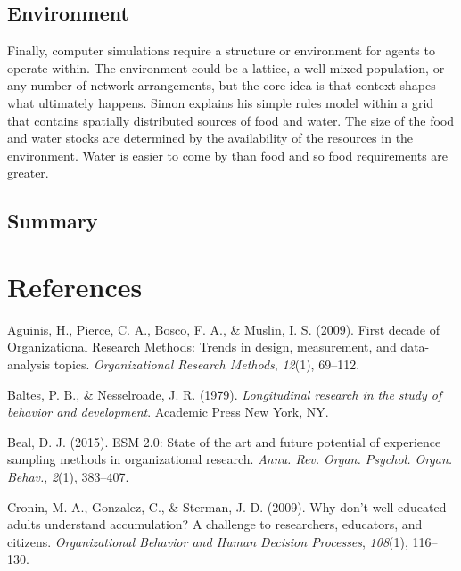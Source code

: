 \documentclass[english,,man]{apa6}
\theoremstyle{definition}
\theoremstyle{definition}
\theoremstyle{definition}
\theoremstyle{remark}
\begin{document}
\hypertarget{environment}{%
\subsection{Environment}\label{environment}}

Finally, computer simulations require a structure or environment for
agents to operate within. The environment could be a lattice, a
well-mixed population, or any number of network arrangements, but the
core idea is that context shapes what ultimately happens. Simon explains
his simple rules model within a grid that contains spatially distributed
sources of food and water. The size of the food and water stocks are
determined by the availability of the resources in the environment.
Water is easier to come by than food and so food requirements are
greater.

\hypertarget{summary-2}{%
\subsection{Summary}\label{summary-2}}

\newpage

\hypertarget{references}{%
\section{References}\label{references}}

\setlength{\parindent}{-0.5in}
\setlength{\leftskip}{0.5in}

\hypertarget{refs}{}
\leavevmode\hypertarget{ref-aguinis_first_2009}{}%
Aguinis, H., Pierce, C. A., Bosco, F. A., \& Muslin, I. S. (2009). First
decade of Organizational Research Methods: Trends in design,
measurement, and data-analysis topics. \emph{Organizational Research
Methods}, \emph{12}(1), 69--112.

\leavevmode\hypertarget{ref-baltes_longitudinal_1979}{}%
Baltes, P. B., \& Nesselroade, J. R. (1979). \emph{Longitudinal research
in the study of behavior and development}. Academic Press New York, NY.

\leavevmode\hypertarget{ref-beal_esm_2015}{}%
Beal, D. J. (2015). ESM 2.0: State of the art and future potential of
experience sampling methods in organizational research. \emph{Annu. Rev.
Organ. Psychol. Organ. Behav.}, \emph{2}(1), 383--407.

\leavevmode\hypertarget{ref-cronin2009don}{}%
Cronin, M. A., Gonzalez, C., \& Sterman, J. D. (2009). Why don't
well-educated adults understand accumulation? A challenge to
researchers, educators, and citizens. \emph{Organizational Behavior and
Human Decision Processes}, \emph{108}(1), 116--130.
\end{document}
